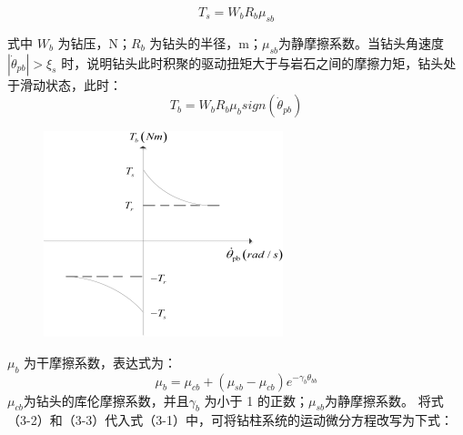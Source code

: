 \documentclass[12pt,hyperref,a4paper,UTF8]{ctexart}
\begin{document}
	
	\begin{equation}
		T_s  = W_bR_b\mu _{sb}
	\end{equation}
	
	
	
	式中 $W_b$ 为钻压，N；$R_b$ 为钻头的半径，m；$\mu _{sb}$为静摩擦系数。当钻头角速度${\left| {{{\dot \theta }_{pb}}} \right| > {\xi _s}}$ 时，说明钻头此时积聚的驱动扭矩大于与岩石之间的摩擦力矩，钻头处于滑动状态，此时：
	\begin{equation}
		T_b  = W_bR_b\mu _bsign (\dot\theta  _{pb})  
	\end{equation}
	
	
	
	\begin{figure}
		\centering
		\includegraphics[width=0.7\linewidth]{figures/钻头摩擦力矩}
		\caption[钻头摩擦力矩]{}
		\label{fig:钻头摩擦力矩}
	\end{figure}
	
	
	$\mu _b$ 为干摩擦系数，表达式为：
	\begin{equation}
		\mu_b = \mu_{cb} + (\mu_{sb} - \mu_{cb})e^{-\gamma_b\theta_{bb}}
	\end{equation}                                                                         $\mu_{cb}$为钻头的库伦摩擦系数，并且$\gamma_b$ 为小于 1 的正数；$\mu_{sb}$为静摩擦系数。
	将式（3-2）和（3-3）代入式（3-1）中，可将钻柱系统的运动微分方程改写为下式：
	
\end{document}
